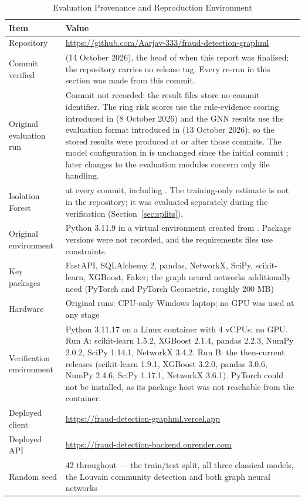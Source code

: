 \begin{table}[htbp]
\centering
\caption{Evaluation Provenance and Reproduction Environment}
\label{tab:provenance}
\small
\begin{tabularx}{\textwidth}{@{}L{3.3cm}Y@{}}
\toprule
\textbf{Item} & \textbf{Value} \\
\midrule
Repository & \url{https://github.com/Aarjav-333/fraud-detection-graphml} \\
Commit verified &  (14 October 2026), the head of  when this report was finalised; the repository carries no release tag. Every re-run in this section was made from this commit. \\
Original evaluation run & Commit not recorded: the result files store no commit identifier. The ring risk scores use the rule-evidence scoring introduced in  (8 October 2026) and the GNN results use the evaluation format introduced in  (13 October 2026), so the stored results were produced at or after those commits. The model configuration in  is unchanged since the initial commit ; later changes to the evaluation modules concern only file handling. \\
Isolation Forest  &  at every commit, including . The training-only estimate  is not in the repository; it was evaluated separately during the verification (Section~\ref{sec:splits}). \\
Original environment & Python 3.11.9 in a virtual environment created from . Package versions were not recorded, and the requirements files use \code{>=} constraints. \\
Key packages & FastAPI, SQLAlchemy 2, pandas, NetworkX, SciPy, scikit-learn, XGBoost, Faker; the graph neural networks additionally need  (PyTorch and PyTorch Geometric, roughly 200 MB) \\
Hardware & Original runs: CPU-only Windows laptop; no GPU was used at any stage \\
Verification environment & Python 3.11.17 on a Linux container with 4 vCPUs; no GPU. Run A: scikit-learn 1.5.2, XGBoost 2.1.4, pandas 2.2.3, NumPy 2.0.2, SciPy 1.14.1, NetworkX 3.4.2. Run B: the then-current releases (scikit-learn 1.9.1, XGBoost 3.2.0, pandas 3.0.6, NumPy 2.4.6, SciPy 1.17.1, NetworkX 3.6.1). PyTorch could not be installed, as its package host was not reachable from the container. \\
Deployed client & \url{https://fraud-detection-graphml.vercel.app} \\
Deployed API & \url{https://fraud-detection-backend.onrender.com} \\
Random seed & 42 throughout --- the train/test split, all three classical models, the Louvain community detection and both graph neural networks \\
\bottomrule
\end{tabularx}
\end{table}

